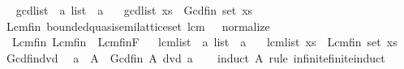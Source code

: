 \begin{isabellebody}
\isadelimproof
\ %
\endisadelimproof
%
\isatagproof
\isacommand{{\isachardot}{\kern0pt}{\isachardot}{\kern0pt}}\isamarkupfalse%
%
\endisatagproof
{\isafoldproof}%
%
\isadelimproof
%
\endisadelimproof
\isanewline
\isanewline
{}\isamarkupfalse%
\ gcd{\isacharunderscore}{\kern0pt}list\ {\isacharcolon}{\kern0pt}{\isacharcolon}{\kern0pt}\ {\isachardoublequoteopen}{\isacharprime}{\kern0pt}a\ list\ {\isasymRightarrow}\ {\isacharprime}{\kern0pt}a{\isachardoublequoteclose}\isanewline
\ \ \ {\isachardoublequoteopen}gcd{\isacharunderscore}{\kern0pt}list\ xs\ {\isasymequiv}\ Gcd\isactrlsub f\isactrlsub i\isactrlsub n\ {\isacharparenleft}{\kern0pt}set\ xs{\isacharparenright}{\kern0pt}{\isachardoublequoteclose}\isanewline
\isanewline
{}\isamarkupfalse%
\ Lcm{\isacharunderscore}{\kern0pt}fin{\isacharcolon}{\kern0pt}\ bounded{\isacharunderscore}{\kern0pt}quasi{\isacharunderscore}{\kern0pt}semilattice{\isacharunderscore}{\kern0pt}set\ lcm\ {}\ {}\ normalize\isanewline
{}\isanewline
\ \ Lcm{\isacharunderscore}{\kern0pt}fin\ {\isacharparenleft}{\kern0pt}{\isachardoublequoteopen}Lcm\isactrlsub f\isactrlsub i\isactrlsub n{\isachardoublequoteclose}{\isacharparenright}{\kern0pt}\ {\isacharequal}{\kern0pt}\ Lcm{\isacharunderscore}{\kern0pt}fin{\isachardot}{\kern0pt}F%
\isadelimproof
\ %
\endisadelimproof
%
\isatagproof
\isacommand{{\isachardot}{\kern0pt}{\isachardot}{\kern0pt}}\isamarkupfalse%
%
\endisatagproof
{\isafoldproof}%
%
\isadelimproof
%
\endisadelimproof
\isanewline
\isanewline
{}\isamarkupfalse%
\ lcm{\isacharunderscore}{\kern0pt}list\ {\isacharcolon}{\kern0pt}{\isacharcolon}{\kern0pt}\ {\isachardoublequoteopen}{\isacharprime}{\kern0pt}a\ list\ {\isasymRightarrow}\ {\isacharprime}{\kern0pt}a{\isachardoublequoteclose}\isanewline
\ \ \ {\isachardoublequoteopen}lcm{\isacharunderscore}{\kern0pt}list\ xs\ {\isasymequiv}\ Lcm\isactrlsub f\isactrlsub i\isactrlsub n\ {\isacharparenleft}{\kern0pt}set\ xs{\isacharparenright}{\kern0pt}{\isachardoublequoteclose}\isanewline
\isanewline
{}\isamarkupfalse%
\ Gcd{\isacharunderscore}{\kern0pt}fin{\isacharunderscore}{\kern0pt}dvd{\isacharcolon}{\kern0pt}\isanewline
\ \ {\isachardoublequoteopen}a\ {\isasymin}\ A\ {\isasymLongrightarrow}\ Gcd\isactrlsub f\isactrlsub i\isactrlsub n\ A\ dvd\ a{\isachardoublequoteclose}\isanewline
%
\isadelimproof
\ \ %
\endisadelimproof
%
\isatagproof
{}\isamarkupfalse%
\ {\isacharparenleft}{\kern0pt}induct\ A\ rule{\isacharcolon}{\kern0pt}\ infinite{\isacharunderscore}{\kern0pt}finite{\isacharunderscore}{\kern0pt}induct{\isacharparenright}{\kern0pt}\isanewline

\end{isabellebody}
